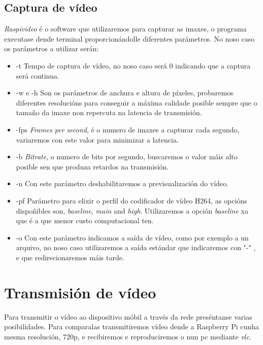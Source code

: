 \subsection{Captura de vídeo}
\emph{Raspivideo} é o software que utilizaremos para capturar as imaxes, o programa executase dende terminal proporcionándolle diferentes parámetros. No noso caso os parámetros a utilizar serán:
\begin{itemize}
    \item -t Tempo de captura de vídeo, no noso caso será 0 indicando que a captura será continua.
    \item -w e -h Son os parámetros de anchura e altura de píxeles, probaremos diferentes resolucións para conseguir a máxima calidade posible sempre que o tamaño da imaxe non repercuta na latencia de transmisión.
    \item -fps \emph{Frames per second}, é o numero de imaxes a capturar cada segundo, variaremos con este valor para minimizar a latencia.
    \item -b \emph{Bitrate}, o numero de bits por segundo, buscaremos o valor máis alto posible sen que produza retardos na transmisión.
    \item -n Con este parámetro deshabilitaremos a previsualización do vídeo.
    \item -pf Parámetro para elixir o perfil do codificador de vídeo H264, as opcións dispoñibles son, \emph{baseline}, \emph{main} and \emph{high}. Utilizaremos a opción \emph{baseline} xa que é a que menor custo computacional ten.
    \item -o Con este parámetro indicamos a saída de vídeo, como por exemplo a un arquivo, no noso caso utilizaremos a saída estándar que indicaremos con "-" , e que redirecionaremos máis tarde.
\end{itemize}

\section{Transmisión de vídeo}
Para transmitir o vídeo ao dispositivo móbil a través da rede preséntanse varias posibilidades. Para comparalas transmitiremos vídeo dende a Raspberry Pi cunha mesma resolución, 720p, e recibiremos e reproduciremos o nun pc mediante \emph{vlc}.

